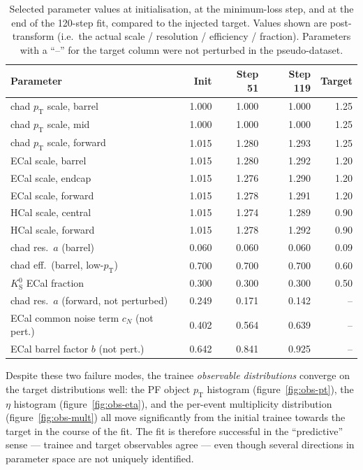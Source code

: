 \documentclass[a4paper,11pt]{article}
\begin{document}
\begin{table}[tbp]
\centering
\caption{Selected parameter values at initialisation, at the
minimum-loss step, and at the end of the 120-step fit, compared to
the injected target. Values shown are post-transform (i.e.\ the
actual scale / resolution / efficiency / fraction). Parameters with a
``--'' for the target column were not perturbed in the
pseudo-dataset.}
\label{tab:recovery}
\small
\begin{tabular}{lrrrr}
\toprule
Parameter & Init & Step 51 & Step 119 & Target \\
\midrule
chad $p_\mathrm{T}$ scale, barrel  & 1.000 & 1.000 & 1.000 & 1.25 \\
chad $p_\mathrm{T}$ scale, mid     & 1.000 & 1.000 & 1.000 & 1.25 \\
chad $p_\mathrm{T}$ scale, forward & 1.015 & 1.280 & 1.293 & 1.25 \\
ECal scale, barrel                 & 1.015 & 1.280 & 1.292 & 1.20 \\
ECal scale, endcap                 & 1.015 & 1.276 & 1.290 & 1.20 \\
ECal scale, forward                & 1.015 & 1.278 & 1.291 & 1.20 \\
HCal scale, central                & 1.015 & 1.274 & 1.289 & 0.90 \\
HCal scale, forward                & 1.015 & 1.278 & 1.292 & 0.90 \\
chad res.\ $a$ (barrel)            & 0.060 & 0.060 & 0.060 & 0.09 \\
chad eff.\ (barrel, low-$p_\mathrm{T}$)  & 0.700 & 0.700 & 0.700 & 0.60 \\
$K^{0}_{\mathrm{S}}$ ECal fraction       & 0.300 & 0.300 & 0.300 & 0.50 \\
\midrule
chad res.\ $a$ (forward, not perturbed)  & 0.249 & 0.171 & 0.142 & -- \\
ECal common noise term $c_N$ (not pert.) & 0.402 & 0.564 & 0.639 & -- \\
ECal barrel factor $b$ (not pert.)       & 0.642 & 0.841 & 0.925 & -- \\
\bottomrule
\end{tabular}
\end{table}

Despite these two failure modes, the trainee \emph{observable
distributions} converge on the target distributions well: the PF
object $p_\mathrm{T}$ histogram (figure~\ref{fig:obs-pt}), the $\eta$
histogram (figure~\ref{fig:obs-eta}), and the per-event multiplicity
distribution (figure~\ref{fig:obs-mult}) all move significantly from
the initial trainee towards the target in the course of the fit. The
fit is therefore successful in the ``predictive'' sense --- trainee
and target observables agree --- even though several directions in
parameter space are not uniquely identified.
\end{document}
